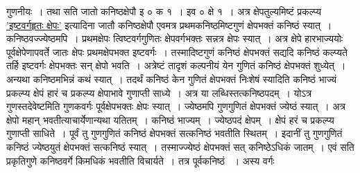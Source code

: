 \documentclass[11pt, openany]{book}
\begin{document}
\newpage

\begin{sloppypar}
\noindent गुणनीयः~। तथा सति जातो कनिष्ठक्षेपौ इ ० क १~। इव ० क्षे १~। अत्र क्षेपतुल्यमिष्टं प्रकल्प्य \hyperref[6.72]{'इष्टवर्गहृतः क्षेपः'} इत्यादिना जातौ कनिष्ठक्षेपौ \; एवमत्र प्रथमकनिष्ठमिष्टगुणं क्षेपभक्तं कनिष्ठं स्यात्~। कनिष्ठवज्ज्येष्ठमपि~। प्रथमक्षेपः त्विष्टवर्गगुणितः क्षेपवर्गभक्तः सन्नत्र क्षेपः स्यात्~। अत्र क्षेपे हारभाज्ययोः पूर्वक्षेपेणापवर्ते जातः क्षेपः \; प्रथमक्षेपभक्त इष्टवर्गः~। तस्मादिष्टगुणं कनिष्ठं क्षेपभक्तं सद्यदि कनिष्ठं कल्प्यते तर्हि इष्टवर्गः क्षेपभक्तः सन् क्षेपो भवति~। अत्रेष्टं तादृशं कल्पनीयं येन गुणितं कनिष्ठं क्षेपभक्तं शुध्येत्~। अन्यथा कनिष्ठमभिन्नं कथं स्यात्~। तदर्थं कनिष्ठं केन गुणितं क्षेपभक्तं निःशेषं स्यादिति कनिष्ठं भाज्यं प्रकल्प्य क्षेपं हारं च प्रकल्प्य क्षेपाभावे गुणाप्ती साध्ये~। अत्र या लब्धिस्तत्कनिष्ठपदम्~। योऽत्र गुणस्तदेवेष्टमिति गुणकवर्गः पूर्वक्षेपभक्तः क्षेपः स्यात्~। ज्येष्ठमपि गुणगुणितं क्षेपभक्तं ज्येष्ठं स्यात्~। अत्र क्षेपो महान् भवतीत्याचार्येणान्यथा यतितम्~। कनिष्ठं भाज्यम्~। ज्येष्ठपदं क्षेपम्~। क्षेपं हरं च प्रकल्प्य गुणाप्ती साधिते~। पूर्वं तु गुणगुणितं कनिष्ठं क्षेपभक्तं सत्कनिष्ठं भवतीति स्थितम्~। इदानीं तु गुणगुणितं कनिष्ठं ज्येष्ठयुतं क्षेपभक्तं सत्कनिष्ठं स्यात्~। तस्माज्ज्येष्ठं क्षेपभक्तं सत् कनिष्ठेऽधिकं जातम्~। एवं सति प्रकृतिगुणे कनिष्ठवर्गे किमधिकं भवतीति विचार्यते~। तत्र पूर्वकनिष्ठं ~। अस्य वर्गः 
\end{sloppypar}
\end{document}
